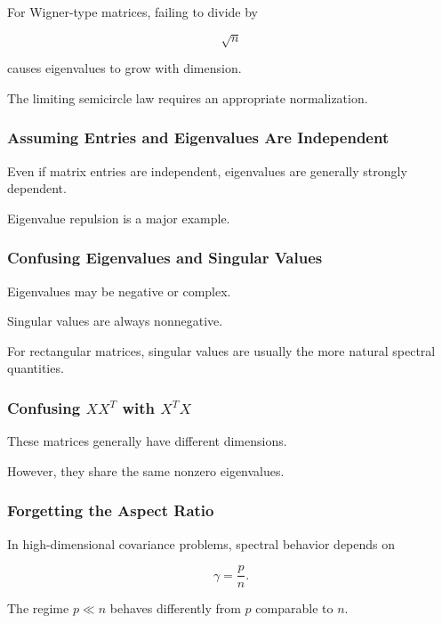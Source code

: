 For Wigner-type matrices, failing to divide by

\[
\sqrt{n}
\]

causes eigenvalues to grow with dimension.

The limiting semicircle law requires an appropriate normalization.

\subsubsection{Assuming Entries and Eigenvalues Are Independent}

Even if matrix entries are independent, eigenvalues are generally
strongly dependent.

Eigenvalue repulsion is a major example.

\subsubsection{Confusing Eigenvalues and Singular Values}

Eigenvalues may be negative or complex.

Singular values are always nonnegative.

For rectangular matrices, singular values are usually the more natural
spectral quantities.

\subsubsection{Confusing \(XX^T\) with \(X^TX\)}

These matrices generally have different dimensions.

However, they share the same nonzero eigenvalues.

\subsubsection{Forgetting the Aspect Ratio}

In high-dimensional covariance problems, spectral behavior depends on

\[
\gamma
=
\frac pn.
\]

The regime \(p\ll n\) behaves differently from \(p\) comparable to \(n\).

